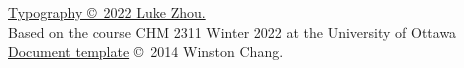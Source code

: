 \documentclass[10pt,landscape]{article}
\begin{document}
\begin{landscape}
\hrulefill

\scriptsize

\href{https://github.com/zhouluke/PhysicsFormulas}{Typography \copyright\ 2022 Luke Zhou.} \\
Based on the course CHM 2311 Winter 2022 at the University of Ottawa \\
\href{http://wch.github.io/latexsheet/}{Document template}  \copyright\ 2014 Winston Chang.

\end{landscape}
\end{document}
